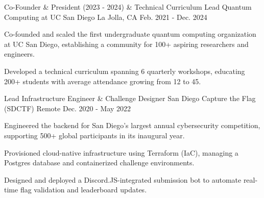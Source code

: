 

\begin{cventries}

  \cventry
    {Co-Founder \& President (2023 - 2024) \& Technical Curriculum Lead}
    {Quantum Computing at UC San Diego}
    {La Jolla, CA}
    {Feb. 2021 - Dec. 2024}
    {
      \begin{cvitems}
        \item {Co-founded and scaled the first undergraduate quantum computing organization at UC San Diego, establishing a community for 100+ aspiring researchers and engineers.}
        \item {Developed a technical curriculum spanning 6 quarterly workshops, educating 200+ students with average attendance growing from 12 to 45.}
      \end{cvitems}
    }

  \cventry
    {Lead Infrastructure Engineer \& Challenge Designer}
    {San Diego Capture the Flag (SDCTF)}
    {Remote}
    {Dec. 2020 - May 2022}
    {
      \begin{cvitems}
        \item {Engineered the backend for San Diego's largest annual cybersecurity competition, supporting 500+ global participants in its inaugural year.}
        \item {Provisioned cloud-native infrastructure using Terraform (IaC), managing a Postgres database and containerized challenge environments.}
        \item {Designed and deployed a Discord.JS-integrated submission bot to automate real-time flag validation and leaderboard updates.}
      \end{cvitems}
    }

\end{cventries}
